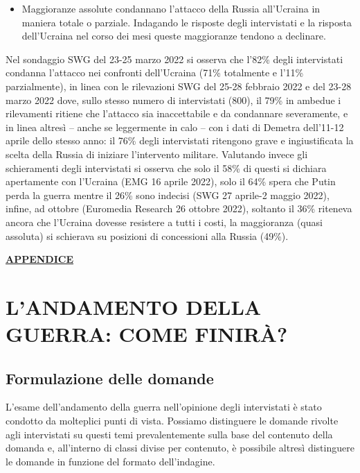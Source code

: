 \documentclass[
  openany]{book}
\providecommand{\tightlist}{%
  \setlength{\itemsep}{0pt}\setlength{\parskip}{0pt}}
\begin{document}
\begin{itemize}
\tightlist
\item
  Maggioranze assolute condannano l'attacco della Russia all'Ucraina in maniera totale o parziale. Indagando le risposte degli intervistati e la risposta dell'Ucraina nel corso dei mesi queste maggioranze tendono a declinare.
\end{itemize}

Nel sondaggio SWG del 23-25 marzo 2022 si osserva che l'82\% degli intervistati condanna l'attacco nei confronti dell'Ucraina (71\% totalmente e l'11\% parzialmente), in linea con le rilevazioni SWG del 25-28 febbraio 2022 e del 23-28 marzo 2022 dove, sullo stesso numero di intervistati (800), il 79\% in ambedue i rilevamenti ritiene che l'attacco sia inaccettabile e da condannare severamente, e in linea altresì -- anche se leggermente in calo -- con i dati di Demetra dell'11-12 aprile dello stesso anno: il 76\% degli intervistati ritengono grave e ingiustificata la scelta della Russia di iniziare l'intervento militare. Valutando invece gli schieramenti degli intervistati si osserva che solo il 58\% di questi si dichiara apertamente con l'Ucraina (EMG 16 aprile 2022), solo il 64\% spera che Putin perda la guerra mentre il 26\% sono indecisi (SWG 27 aprile-2 maggio 2022), infine, ad ottobre (Euromedia Research 26 ottobre 2022), soltanto il 36\% riteneva ancora che l'Ucraina dovesse resistere a tutti i costi, la maggioranza (quasi assoluta) si schierava su posizioni di concessioni alla Russia (49\%).

\href{https://github.com/LucianaFazio/Ucrania/blob/main/PDF_Appendice/III.\%20Le\%20cause\%20della\%20guerra_v.5.pdf}{\textbf{APPENDICE}}

\hypertarget{landamento-della-guerra-come-finiruxe0}{%
\chapter{L'ANDAMENTO DELLA GUERRA: COME FINIRÀ?}\label{landamento-della-guerra-come-finiruxe0}}

\hypertarget{formulazione-delle-domande-2}{%
\section{Formulazione delle domande}\label{formulazione-delle-domande-2}}

L'esame dell'andamento della guerra nell'opinione degli intervistati è stato condotto da molteplici punti di vista. Possiamo distinguere le domande rivolte agli intervistati su questi temi prevalentemente sulla base del contenuto della domanda e, all'interno di classi divise per contenuto, è possibile altresì distinguere le domande in funzione del formato dell'indagine.
\end{document}
